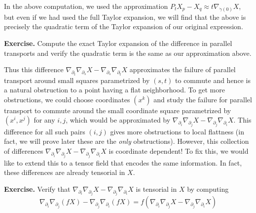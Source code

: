 \documentclass[
]{article}
\begin{document}
In the above computation, we used the approximation
\(P_t X_p - X_q \approx t \nabla_{\dot{\gamma}(0)}X\), but even if we
had used the full Taylor expansion, we will find that the above is
precisely the quadratic term of the Taylor expansion of our original
expression.

\textbf{Exercise.} Compute the exact Taylor expansion of the difference
in parallel transports and verify the quadratic term is the same as our
approximation above.

Thus this difference
\(\nabla_{\partial_t}\nabla_{\partial_s} X - \nabla_{\partial_s}\nabla_{\partial_t} X\)
approximates the failure of parallel transport around small squares
parametrized by \((s,t)\) to commute and hence is a natural obstruction
to a point having a flat neighborhood. To get more obstructions, we
could choose coordinates \((x^k)\) and study the failure for parallel
transport to commute around the small coordinate square parametrized by
\((x^i, x^j)\) for any \(i,j\), which would be approximated by
\(\nabla_{\partial_{i}}\nabla_{\partial_{j}} X - \nabla_{\partial_{j}}\nabla_{\partial_{i}} X\).
This difference for all such pairs \((i,j)\) gives more obstructions to
local flattness (in fact, we will prove later these are the \emph{only}
obstructions). However, this collection of differences
\(\nabla_{\partial_{i}}\nabla_{\partial_{j}} X - \nabla_{\partial_{j}}\nabla_{\partial_{i}} X\)
is coordinate dependent! To fix this, we would like to extend this to a
tensor field that encodes the same information. In fact, these
differences are already tensorial in \(X\).

\textbf{Exercise.} Verify that
\(\nabla_{\partial_{i}}\nabla_{\partial_{j}} X - \nabla_{\partial_{j}}\nabla_{\partial_{i}} X\)
is tensorial in \(X\) by computing \[
    \nabla_{\partial_{i}}\nabla_{\partial_{j}} (fX) - \nabla_{\partial_{j}}\nabla_{\partial_{i}} (fX) 
    = f(\nabla_{\partial_{i}}\nabla_{\partial_{j}} X - \nabla_{\partial_{j}}\nabla_{\partial_{i}} X)
\]
\end{document}
